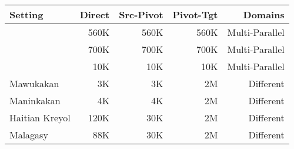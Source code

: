 \begin{tabular}{lrrrr}
\toprule
Setting & Direct & Src-Pivot & Pivot-Tgt & Domains\\
\toprule
~\cite{Utiyama:07} & 560K & 560K & 560K & Multi-Parallel\\
~\cite{Cohn:07} & 700K & 700K & 700K & Multi-Parallel\\
~\cite{Cohn:07} & 10K & 10K & 10K & Multi-Parallel\\
\midrule
Mawukakan & 3K & 3K & 2M & Different\\
Maninkakan & 4K & 4K & 2M  & Different \\ 
Haitian Kreyol & 120K & 30K & 2M & Different\\
Malagasy & 88K & 30K & 2M & Different\\
\bottomrule
\end{tabular}
 
